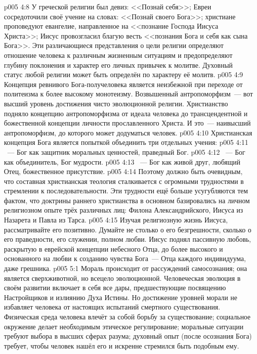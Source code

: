 \vs p005 4:8 У греческой религии был девиз: <<Познай себя>>; Евреи сосредоточили своё учение на словах: <<Познай своего Бога>>; христиане проповедуют евангелие, направленное на <<познание Господа Иисуса Христа>>; Иисус провозгласил благую весть <<познания Бога и себя как сына Бога>>. Эти различающиеся представления о цели религии определяют отношение человека к различным жизненным ситуациям и предопределяют глубину поклонения и характер его личных привычек к молитве. Духовный статус любой религии может быть определён по характеру её молитв.
\vs p005 4:9 \pc Концепция ревнивого Бога\hyp{}получеловека является неизбежной при переходе от политеизма к более высокому монотеизму. Возвышенный антропоморфизм~--- вот высший уровень достижения чисто эволюционной религии. Христианство подняло концепцию антропоморфизма от идеала человека до трансцендентной и божественной концепции личности прославленного Христа. И это~--- наивысший антропоморфизм, до которого может додуматься человек.
\vs p005 4:10 \pc Христианская концепция Бога является попыткой объединить три отдельных учения:
\vs p005 4:11 ~--- Бог как защитник моральных ценностей, праведный Бог.
\vs p005 4:12 ~--- Бог как объединитель, Бог мудрости.
\vs p005 4:13 ~--- Бог как живой друг, любящий Отец, божественное присутствие.
\vs p005 4:14 \pc Поэтому должно быть очевидным, что составная христианская теология сталкивается с огромными трудностями в стремлении к последовательности. Эти трудности ещё больше усугубляются тем фактом, что доктрины раннего христианства в основном базировались на личном религиозном опыте трёх различных лиц: Филона Александрийского, Иисуса из Назарета и Павла из Тарса.
\vs p005 4:15 \pc Изучая религиозную жизнь Иисуса, рассматривайте его позитивно. Думайте не столько о его безгрешности, сколько о его праведности, его служении, полном любви. Иисус поднял пассивную любовь, раскрытую в еврейской концепции небесного Отца, до более высокого  и основанного на любви к созданию чувства Бога~--- Отца каждого индивидуума, даже грешника.
\vs p005 5:1 Мораль происходит от рассуждений самосознания; она является сверхживотной, но всецело эволюционной. Человеческая эволюция в своём развитии включает в себя все дары, предшествующие посвящению Настройщиков и излиянию Духа Истины. Но достижение уровней морали не избавляет человека от настоящих испытаний смертного существования. Физическая среда человека влечёт за собой борьбу за существование; социальное окружение делает необходимым этическое регулирование; моральные ситуации требуют выбора в высших сферах разума; духовный опыт (после осознания Бога) требует, чтобы человек нашёл его и искренне стремился быть подобным ему.
